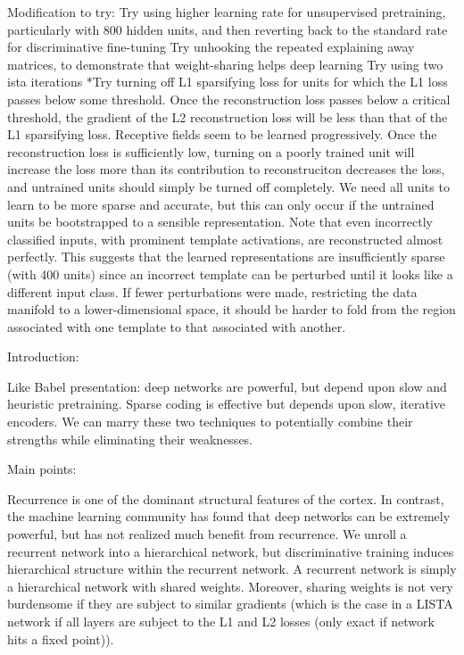 Modification to try:
Try using higher learning rate for unsupervised pretraining, particularly with 800 hidden units, and then reverting back to the standard rate for discriminative fine-tuning
Try unhooking the repeated explaining away matrices, to demonstrate that weight-sharing helps deep learning
Try using two ista iterations
*Try turning off L1 sparsifying loss for units for which the L1 loss passes below some threshold.  Once the reconstruction loss passes below a critical threshold, the gradient of the L2 reconstruction loss will be less than that of the L1 sparsifying loss.  Receptive fields seem to be learned progressively.  Once the reconstruction loss is sufficiently low, turning on a poorly trained unit will increase the loss more than its contribution to reconstruciton decreases the loss, and untrained units should simply be turned off completely.  We need all units to learn to be more sparse and accurate, but this can only occur if the untrained units be bootstrapped to a sensible representation.  
Note that even incorrectly classified inputs, with prominent template activations, are reconstructed almost perfectly.  This suggests that the learned representations are insufficiently sparse (with 400 units) since an incorrect template can be perturbed until it looks like a different input class.  If fewer perturbations were made, restricting the data manifold to a lower-dimensional space, it should be harder to fold from the region associated with one template to that associated with another.


Introduction:

Like Babel presentation: deep networks are powerful, but depend upon slow and heuristic pretraining.  Sparse coding is effective but depends upon slow, iterative encoders.  We can marry these two techniques to potentially combine their strengths while eliminating their weaknesses.




Main points:

Recurrence is one of the dominant structural features of the cortex.  In contrast, the machine learning community has found that deep networks can be extremely powerful, but has not realized much benefit from recurrence.  We unroll a recurrent network into a hierarchical network, but discriminative training induces hierarchical structure within the recurrent network.  A recurrent network is simply a hierarchical network with shared weights.  Moreover, sharing weights is not very burdensome if they are subject to similar gradients (which is the case in a LISTA network if all layers are subject to the L1 and L2 losses (only exact if network hits a fixed point)).  

